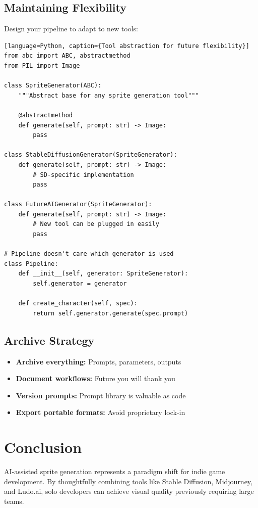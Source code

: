 \documentclass[11pt]{article}
\begin{document}
\subsection{Maintaining Flexibility}

Design your pipeline to adapt to new tools:

\begin{verbatim}[language=Python, caption={Tool abstraction for future flexibility}]
from abc import ABC, abstractmethod
from PIL import Image

class SpriteGenerator(ABC):
    """Abstract base for any sprite generation tool"""

    @abstractmethod
    def generate(self, prompt: str) -> Image:
        pass

class StableDiffusionGenerator(SpriteGenerator):
    def generate(self, prompt: str) -> Image:
        # SD-specific implementation
        pass

class FutureAIGenerator(SpriteGenerator):
    def generate(self, prompt: str) -> Image:
        # New tool can be plugged in easily
        pass

# Pipeline doesn't care which generator is used
class Pipeline:
    def __init__(self, generator: SpriteGenerator):
        self.generator = generator

    def create_character(self, spec):
        return self.generator.generate(spec.prompt)
\end{verbatim}

\subsection{Archive Strategy}

\begin{itemize}
    \item \textbf{Archive everything:} Prompts, parameters, outputs
    \item \textbf{Document workflows:} Future you will thank you
    \item \textbf{Version prompts:} Prompt library is valuable as code
    \item \textbf{Export portable formats:} Avoid proprietary lock-in
\end{itemize}

\section{Conclusion}

AI-assisted sprite generation represents a paradigm shift for indie game development. By thoughtfully combining tools like Stable Diffusion, Midjourney, and Ludo.ai, solo developers can achieve visual quality previously requiring large teams.
\end{document}

